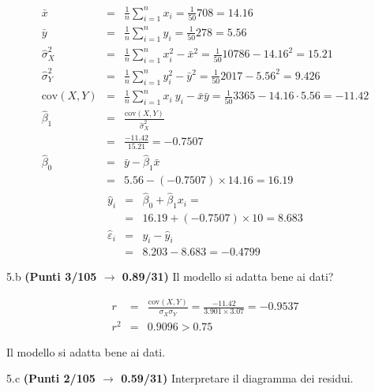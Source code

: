\documentclass[
  11pt,
]{book}
\theoremstyle{mytheoremstyle}
\theoremstyle{mydefstyle}
\newenvironment{sol}
  {
  \begin{tcolorbox}[enhanced,breakable,arc=0.1mm,boxrule=1pt,colback=white,colframe=iblue,
  title=\bf \fontfamily{lmss}\selectfont \hspace{.5 cm} Soluzione,drop fuzzy shadow]

}{
\end{tcolorbox}
  }
\begin{document}
\begin{sol}
\begin{eqnarray*}
           \bar x &=&\frac 1 n\sum_{i=1}^n x_i = \frac {1}{ 50 }  708 =  14.16 \\
           \bar y &=&\frac 1 n\sum_{i=1}^n y_i = \frac {1}{ 50 }  278 =  5.56 \\
           \hat\sigma_X^2&=&\frac 1 n\sum_{i=1}^n x_i^2-\bar x^2=\frac {1}{ 50 }  10786  - 14.16 ^2= 15.21 \\
           \hat\sigma_Y^2&=&\frac 1 n\sum_{i=1}^n y_i^2-\bar y^2=\frac {1}{ 50 }  2017  - 5.56 ^2= 9.426 \\
           \text{cov}(X,Y)&=&\frac 1 n\sum_{i=1}^n x_i~y_i-\bar x\bar y=\frac {1}{ 50 }  3365 - 14.16 \cdot 5.56 = -11.42 \\
           \hat\beta_1 &=& \frac{\text{cov}(X,Y)}{\hat\sigma_X^2} \\
                    &=& \frac{ -11.42 }{ 15.21 }  =  -0.7507 \\
           \hat\beta_0 &=& \bar y - \hat\beta_1 \bar x\\
                    &=&  5.56 - (-0.7507) \times  14.16 = 16.19 
         \end{eqnarray*}\begin{eqnarray*}
\hat y_i &=&\hat\beta_0+\hat\beta_1 x_i=\\ 
&=& 16.19 + (-0.7507) \times 10 = 8.683 \\ 
\hat \varepsilon_i &=& y_i-\hat y_i\\ 
&=& 8.203 - 8.683 = -0.4799  
\end{eqnarray*}

\end{sol}

5.b \textbf{(Punti 3/105 \(\rightarrow\) 0.89/31)} Il modello si adatta bene ai dati?

\begin{sol}
\begin{eqnarray*}
r&=&\frac{\text{cov}(X,Y)}{\sigma_X\sigma_Y}=\frac{ -11.42 }{ 3.901 \times 3.07 }= -0.9537 \\ 
r^2&=& 0.9096 > 0.75
\end{eqnarray*}

Il modello si adatta bene ai dati.

\end{sol}

5.c \textbf{(Punti 2/105 \(\rightarrow\) 0.59/31)} Interpretare il diagramma dei residui.
\end{document}
